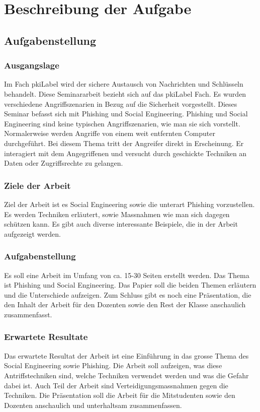 \chapter{Beschreibung der Aufgabe}

\section{Aufgabenstellung}

\subsection{Ausgangslage}
Im Fach \Gls{pkiLabel} wird der sichere Austausch von Nachrichten und Schlüsseln behandelt. Diese Seminararbeit bezieht sich auf das \Gls{pkiLabel} Fach. Es wurden verschiedene Angriffszenarien in Bezug auf die Sicherheit vorgestellt. Dieses Seminar befasst sich mit Phishing und Social Engineering.
Phishing und Social Engineering sind keine typischen Angriffszenarien, wie man sie sich vorstellt. Normalerweise werden Angriffe von einem weit entfernten Computer durchgeführt. Bei diesem Thema tritt der Angreifer direkt in Erscheinung. Er interagiert mit dem Angegriffenen und versucht durch geschickte Techniken an Daten oder Zugriffsrechte zu gelangen. 

\subsection{Ziele der Arbeit}
Ziel der Arbeit ist es Social Engineering sowie die unterart Phishing vorzustellen. Es werden Techniken erläutert, sowie Massnahmen wie man sich dagegen schützen kann. Es gibt auch diverse interessante Beispiele, die in der Arbeit aufgezeigt werden. 

\subsection{Aufgabenstellung}
Es soll eine Arbeit im Umfang von ca. 15-30 Seiten erstellt werden. Das Thema ist Phishing und Social Engineering. Das Papier soll die beiden Themen erläutern und die Unterschiede aufzeigen.
Zum Schluss gibt es noch eine Präsentation, die den Inhalt der Arbeit für den Dozenten sowie den Rest der Klasse anschaulich zusammenfasst.

\subsection{Erwartete Resultate}
Das erwartete Resultat der Arbeit ist eine Einführung in das grosse Thema des Social Engineering sowie Phishing. Die Arbeit soll aufzeigen, was diese Antriffstechniken sind, welche Techniken verwendet werden und was die Gefahr dabei ist. Auch Teil der Arbeit sind Verteidigungsmassnahmen gegen die Techniken.
Die Präsentation soll die Arbeit für die Mitstudenten sowie den Dozenten anschaulich und unterhaltsam zusammenfassen.